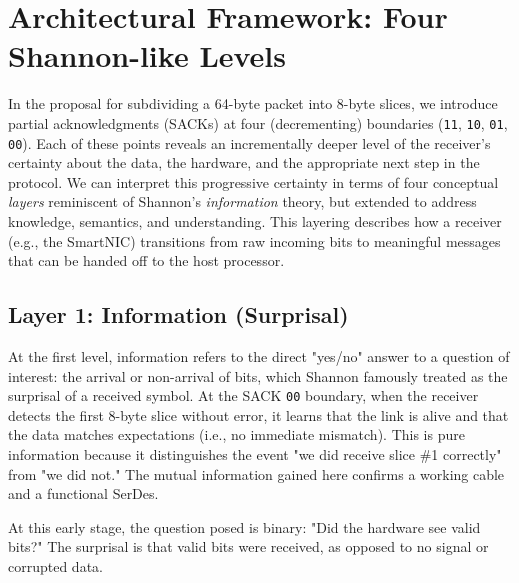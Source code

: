 \section{Architectural Framework: Four Shannon-like Levels}

In the proposal for subdividing a 64-byte packet into 8-byte slices, we introduce partial acknowledgments (SACKs) at four (decrementing) boundaries (\texttt{11}, \texttt{10}, \texttt{01}, \texttt{00}). Each of these points reveals an incrementally deeper level of the receiver’s certainty about the data, the hardware, and the appropriate next step in the protocol. We can interpret this progressive certainty in terms of four conceptual \emph{layers} reminiscent of Shannon’s \emph{information} theory, but extended to address knowledge, semantics, and understanding. This layering describes how a receiver (e.g., the SmartNIC) transitions from raw incoming bits to meaningful messages that can be handed off to the host processor.


\subsection{Layer 1: Information (Surprisal)}

At the first level, information refers to the direct "yes/no" answer to a question of interest: the arrival or non-arrival of bits, which Shannon famously treated as the surprisal of a received symbol. At the SACK \texttt{00} boundary, when the receiver detects the first 8-byte slice without error, it learns that the link is alive and that the data matches expectations (i.e., no immediate mismatch). This is pure information because it distinguishes the event "we did receive slice \#1 correctly" from "we did not." The mutual information gained here confirms a working cable and a functional SerDes.

At this early stage, the question posed is binary: "Did the hardware see valid bits?" The surprisal is that valid bits were received, as opposed to no signal or corrupted data.

